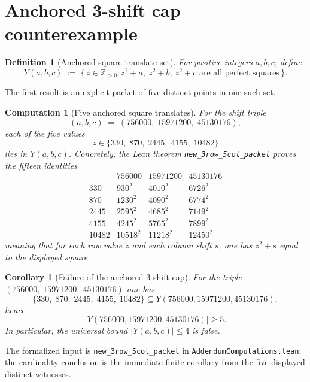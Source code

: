 \documentclass[11pt]{article}
\theoremstyle{plainbreak}
\newtheorem{corollary}[theorem]{Corollary}
\theoremstyle{defbreak}
\newtheorem{definition}[theorem]{Definition}
\newtheorem{computation}[theorem]{Computation}
\begin{document}
\section{Anchored 3-shift cap counterexample}

\begin{definition}[Anchored square-translate set]
For positive integers $a,b,c$, define
\[
  Y(a,b,c)
  \;:=\;
  \bigl\{\,z\in\mathbb{Z}_{>0} :
    z^2+a,\ z^2+b,\ z^2+c \text{ are all perfect squares}\,\bigr\}.
\]
\end{definition}

The first result is an explicit packet of five distinct points in one such
set.

\begin{computation}[Five anchored square translates]\label{comp:packet}
For the shift triple
\[
  (a,b,c) \;=\; (756000,\;15971200,\;45130176),
\]
each of the five values
\[
  z \in \{330,\;870,\;2445,\;4155,\;10482\}
\]
lies in $Y(a,b,c)$.
Concretely, the Lean theorem
\texttt{new\_3row\_5col\_packet} proves the fifteen identities
\[
\renewcommand{\arraystretch}{1.15}
\begin{array}{r|ccc}
     & 756000 & 15971200 & 45130176 \\\hline
330  & 930^2   & 4010^2   & 6726^2   \\
870  & 1230^2  & 4090^2   & 6774^2   \\
2445 & 2595^2  & 4685^2   & 7149^2   \\
4155 & 4245^2  & 5765^2   & 7899^2   \\
10482 & 10518^2 & 11218^2 & 12450^2
\end{array}
\]
meaning that for each row value $z$ and each column shift $s$, one has
$z^2+s$ equal to the displayed square.
\end{computation}

\begin{corollary}[Failure of the anchored 3-shift cap]
For the triple $(756000,\;15971200,\;45130176)$ one has
\[
  \{330,\;870,\;2445,\;4155,\;10482\} \subseteq Y(756000,15971200,45130176),
\]
hence
\[
  |Y(756000,15971200,45130176)| \ge 5.
\]
In particular, the universal bound $|Y(a,b,c)|\le 4$ is false.
\end{corollary}
\noindent The formalized input is
\texttt{new\_3row\_5col\_packet} in \texttt{AddendumComputations.lean};
the cardinality conclusion is the immediate finite corollary from the five
displayed distinct witnesses.
\end{document}
